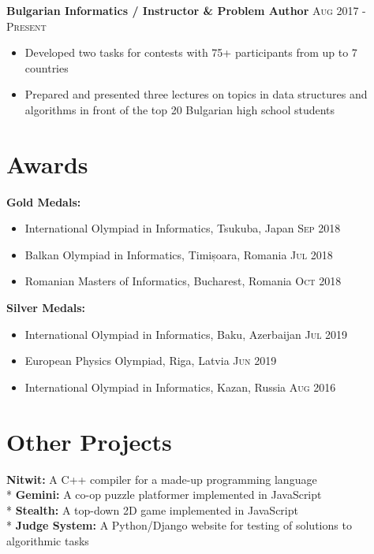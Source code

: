 \documentclass[letterpaper,11pt]{article}
\newcommand{\noskip}{\vspace{-\parskip}}
\newcommand{\doskip}{\vspace{\parskip}}
\begin{document}
\textbf{Bulgarian Informatics / Instructor \& Problem Author}
\hfill
\textsc{Aug 2017 - Present}
\noskip
\begin{itemize}
    \item Developed two tasks for contests with 75+ participants from up to 7
        countries
    \item Prepared and presented three lectures on topics in data structures and
        algorithms in front of the top 20 Bulgarian high school students
\end{itemize}

\section*{Awards}
\textbf{Gold Medals:}
\noskip
\begin{itemize}
    \item International Olympiad in Informatics, Tsukuba, Japan
        \hfill \textsc{Sep 2018}
    \item Balkan Olympiad in Informatics, Timișoara, Romania
        \hfill \textsc{Jul 2018}
    \item Romanian Masters of Informatics, Bucharest, Romania
        \hfill \textsc{Oct 2018}
\end{itemize}

\textbf{Silver Medals:}
\noskip
\begin{itemize}
    \item International Olympiad in Informatics, Baku, Azerbaijan
        \hfill \textsc{Jul 2019}
    \item European Physics Olympiad, Riga, Latvia
        \hfill \textsc{Jun 2019}
    \item International Olympiad in Informatics, Kazan, Russia
        \hfill \textsc{Aug 2016}
\end{itemize}

\section*{Other Projects}
\textbf{Nitwit:} A C++ compiler for a made-up programming language\\*
\textbf{Gemini:} A co-op puzzle platformer implemented in JavaScript\\*
\textbf{Stealth:} A top-down 2D game implemented in JavaScript\\*
\textbf{Judge System:} A Python/Django website for testing of solutions
to algorithmic tasks
\end{document}
